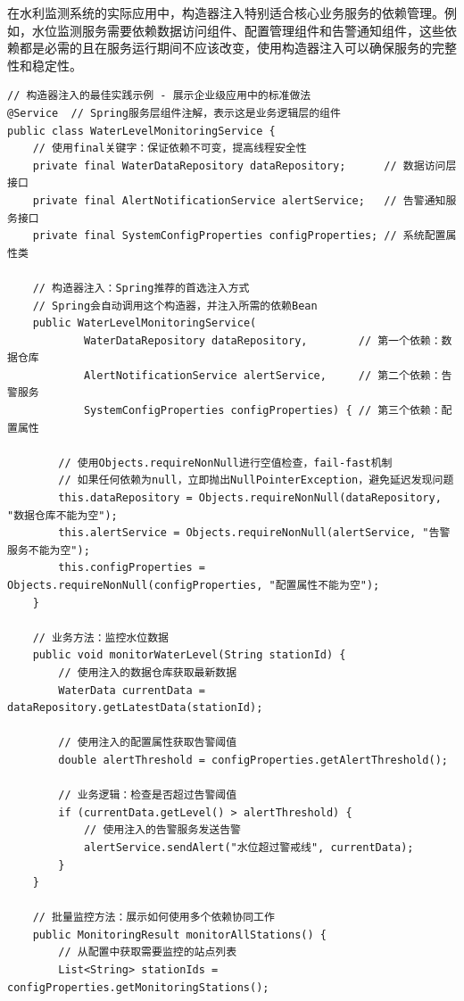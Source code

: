 在水利监测系统的实际应用中，构造器注入特别适合核心业务服务的依赖管理。例如，水位监测服务需要依赖数据访问组件、配置管理组件和告警通知组件，这些依赖都是必需的且在服务运行期间不应该改变，使用构造器注入可以确保服务的完整性和稳定性。

\begin{lstlisting}[style=java]
// 构造器注入的最佳实践示例 - 展示企业级应用中的标准做法
@Service  // Spring服务层组件注解，表示这是业务逻辑层的组件
public class WaterLevelMonitoringService {
    // 使用final关键字：保证依赖不可变，提高线程安全性
    private final WaterDataRepository dataRepository;      // 数据访问层接口
    private final AlertNotificationService alertService;   // 告警通知服务接口
    private final SystemConfigProperties configProperties; // 系统配置属性类
    
    // 构造器注入：Spring推荐的首选注入方式
    // Spring会自动调用这个构造器，并注入所需的依赖Bean
    public WaterLevelMonitoringService(
            WaterDataRepository dataRepository,        // 第一个依赖：数据仓库
            AlertNotificationService alertService,     // 第二个依赖：告警服务
            SystemConfigProperties configProperties) { // 第三个依赖：配置属性
        
        // 使用Objects.requireNonNull进行空值检查，fail-fast机制
        // 如果任何依赖为null，立即抛出NullPointerException，避免延迟发现问题
        this.dataRepository = Objects.requireNonNull(dataRepository, "数据仓库不能为空");
        this.alertService = Objects.requireNonNull(alertService, "告警服务不能为空");  
        this.configProperties = Objects.requireNonNull(configProperties, "配置属性不能为空");
    }
    
    // 业务方法：监控水位数据
    public void monitorWaterLevel(String stationId) {
        // 使用注入的数据仓库获取最新数据
        WaterData currentData = dataRepository.getLatestData(stationId);
        
        // 使用注入的配置属性获取告警阈值
        double alertThreshold = configProperties.getAlertThreshold();
        
        // 业务逻辑：检查是否超过告警阈值
        if (currentData.getLevel() > alertThreshold) {
            // 使用注入的告警服务发送告警
            alertService.sendAlert("水位超过警戒线", currentData);
        }
    }
    
    // 批量监控方法：展示如何使用多个依赖协同工作
    public MonitoringResult monitorAllStations() {
        // 从配置中获取需要监控的站点列表
        List<String> stationIds = configProperties.getMonitoringStations();
        

\end{lstlisting}

